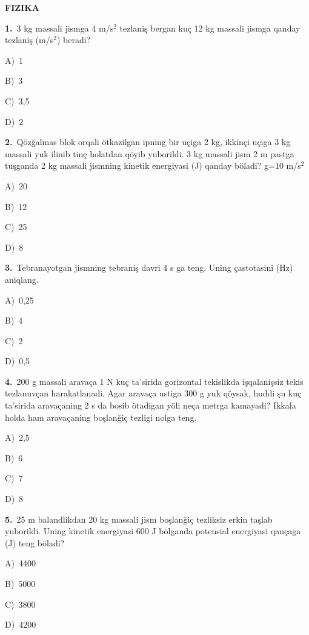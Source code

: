 \documentclass[11pt,a4paper]{article}
\newcommand{\opt}[2]{\hspace*{4mm}#1)\ #2\par}
\begin{document}
\begin{center}{\Large\textbf{FIZIKA}}\end{center}
\noindent\begin{minipage}{\linewidth}
\textbf{1.}\ 3 kg massali jismga 4 m/s$^{2}$ tezlaniş bergan kuç 12 kg massali jismga qanday tezlaniş (m/s$^{2}$) beradi?\par\smallskip
\opt{A}{1}
\opt{B}{3}
\opt{C}{3,5}
\opt{D}{2}
\end{minipage}\vspace{9pt}\par
\noindent\begin{minipage}{\linewidth}
\textbf{2.}\ Qözğalmas blok orqali ötkazilgan ipning bir uçiga 2 kg, ikkinçi uçiga 3 kg massali yuk ilinib tinç holatdan qöyib yuborildi. 3 kg massali jism 2 m pastga tuşganda 2 kg massali jismning kinetik energiyasi (J) qanday böladi? g=10 m/s$^{2}$\par\smallskip
\opt{A}{20}
\opt{B}{12}
\opt{C}{25}
\opt{D}{8}
\end{minipage}\vspace{9pt}\par
\noindent\begin{minipage}{\linewidth}
\textbf{3.}\ Tebranayotgan jismning tebraniş davri 4 s ga teng. Uning çastotasini (Hz) aniqlang.\par\smallskip
\opt{A}{0,25}
\opt{B}{4}
\opt{C}{2}
\opt{D}{0,5}
\end{minipage}\vspace{9pt}\par
\noindent\begin{minipage}{\linewidth}
\textbf{4.}\ 200 g massali aravaça 1 N kuç ta’sirida gorizontal tekislikda işqalanişsiz tekis tezlanuvçan harakatlanadi. Agar aravaça ustiga 300 g yuk qöysak, huddi şu kuç ta’sirida aravaçaning 2 s da bosib ötadigan yöli neça metrga kamayadi? Ikkala holda ham aravaçaning boşlanğiç tezligi nolga teng.\par\smallskip
\opt{A}{2,5}
\opt{B}{6}
\opt{C}{7}
\opt{D}{8}
\end{minipage}\vspace{9pt}\par
\noindent\begin{minipage}{\linewidth}
\textbf{5.}\ 25 m balandlikdan 20 kg massali jism boşlanğiç tezliksiz erkin taşlab yuborildi. Uning kinetik energiyasi 600 J bölganda potensial energiyasi qançaga (J) teng böladi?\par\smallskip
\opt{A}{4400}
\opt{B}{5000}
\opt{C}{3800}
\opt{D}{4200}
\end{minipage}\vspace{9pt}\par
\end{document}
